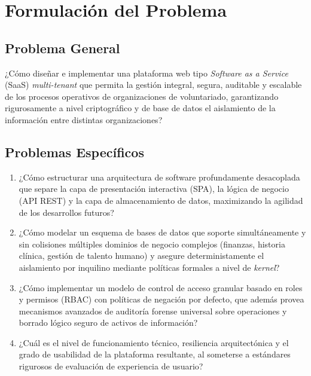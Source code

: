 \section{Formulación del Problema}

\subsection{Problema General}
¿Cómo diseñar e implementar una plataforma web tipo \textit{Software as a Service} (SaaS) \textit{multi-tenant} que permita la gestión integral, segura, auditable y escalable de los procesos operativos de organizaciones de voluntariado, garantizando rigurosamente a nivel criptográfico y de base de datos el aislamiento de la información entre distintas organizaciones?

\subsection{Problemas Específicos}
\begin{enumerate}[label=\alph*.]
    \item ¿Cómo estructurar una arquitectura de software profundamente desacoplada que separe la capa de presentación interactiva (SPA), la lógica de negocio (API REST) y la capa de almacenamiento de datos, maximizando la agilidad de los desarrollos futuros?
    \item ¿Cómo modelar un esquema de bases de datos que soporte simultáneamente y sin colisiones múltiples dominios de negocio complejos (finanzas, historia clínica, gestión de talento humano) y asegure deterministamente el aislamiento por inquilino mediante políticas formales a nivel de \textit{kernel}?
    \item ¿Cómo implementar un modelo de control de acceso granular basado en roles y permisos (RBAC) con políticas de negación por defecto, que además provea mecanismos avanzados de auditoría forense universal sobre operaciones y borrado lógico seguro de activos de información?
    \item ¿Cuál es el nivel de funcionamiento técnico, resiliencia arquitectónica y el grado de usabilidad de la plataforma resultante, al someterse a estándares rigurosos de evaluación de experiencia de usuario?
\end{enumerate}

